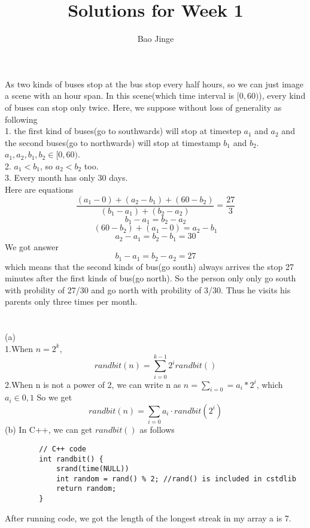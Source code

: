 \documentclass{article}
\author{Bao Jinge}
\title{Solutions for Week 1}
\date{}
\begin{document}
	\maketitle
	\section{}
		As two kinds of buses stop at the bus stop every half hours, so we can just image a scene with an hour span. In this scene(which time interval is $[0,60)$), every kind of buses can stop only twice. Here, we suppose without loss of generality as following\\
		1. the first kind of buses(go to southwards) will stop at timestep $a_1$ and $a_2$ and the second buses(go to northwards) will stop at timestamp $b_1$ and $b_2$. $a_1, a_2, b_1, b_2\in[0,60)$.\\
		2. $a_1 < b_1$, so $a_2 < b_2$ too.\\
		3. Every month has only 30 days.\\
		Here are equations
		$$\frac{(a_1 - 0) + (a_2 - b_1) + (60 - b_2)}{(b_1 - a_1) + (b_2 - a_2)} = \frac{27}{3}$$
		$$b_1 - a_1 = b_2 - a_2$$
		$$(60 - b_2) + (a_1 - 0) = a_2 - b_1$$
		$$a_2 - a_1 = b_2 - b_1 = 30$$
		We got answer
		$$b_1 - a_1 = b_2 - a_2 = 27$$
		which means that the second kinds of bus(go south) always arrives the stop 27 minutes after the first kinds of bus(go north). So the person only only go south with probility of 27/30 and go north with probility of 3/30. Thus he visits his parents only three times per month.

	\section{}
	(a)\\
	1.When $n = 2^k$,\\
		$$randbit(n) = \sum_{i = 0}^{k-1}2^irandbit()$$
		2.When n is not a power of 2, we can write n as $n = \sum_{i=0}{} = a_i * 2^i$, which $a_i \in {0,1}$
		So we get
		$$randbit(n) = \sum_{i = 0}{}a_i \cdot randbit(2^i)$$
	(b) In C++, we can get $randbit()$ as follows
		\begin{lstlisting}
		// C++ code
		int randbit() {
			srand(time(NULL))
			int random = rand() % 2; //rand() is included in cstdlib
			return random;
		}
		\end{lstlisting}
		After running code, we got the length of the longest streak in my array a is 7.
\end{document}
